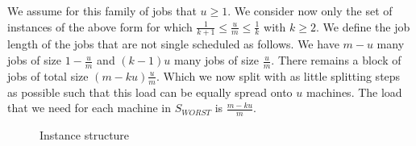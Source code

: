\documentclass[11pt]{article}
\begin{document}
We assume for this family of jobs that $u \geq 1$. 
We consider now only the set of instances of the above form for which $\frac{1}{k+1} \leq \frac{u}{m} \leq \frac{1}{k}$ with $k \geq 2$.
We define the job length of the jobs that are not single scheduled as follows. We have $m-u$ many jobs of size $1-\frac{u}{m}$ and $(k-1)u$ many jobs of size $\frac{u}{m}$.   
There remains a block of jobs of total size $(m-ku)\frac{u}{m}$. Which we now split with as little splitting steps as possible such that this load can be equally spread onto $u$ machines.
The load that we need for each machine in $S_{WORST}$ is $\frac{m-ku}{m}$. 
\begin{figure}[ht]
\centering


\caption{Instance structure}
\label{fig:instance-structure}

\end{figure}
\end{document}
